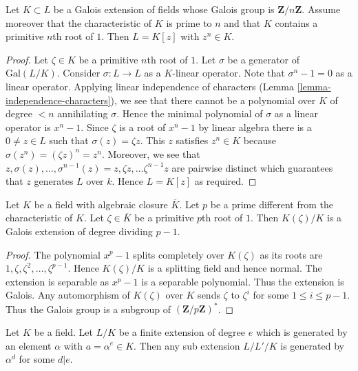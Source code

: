 \begin{lemma}
\label{lemma-Kummer}
Let $K \subset L$ be a Galois extension of fields whose Galois group is
$\mathbf{Z}/n\mathbf{Z}$. Assume moreover that the characteristic of $K$
is prime to $n$ and that $K$ contains a primitive $n$th root of $1$.
Then $L = K[z]$ with $z^n \in K$.
\end{lemma}

\begin{proof}
Let $\zeta \in K$ be a primitive $n$th root of $1$.
Let $\sigma$ be a generator of $\text{Gal}(L/K)$.
Consider $\sigma : L \to L$ as a $K$-linear operator.
Note that $\sigma^n - 1 = 0$ as a linear operator.
Applying linear independence of characters
(Lemma \ref{lemma-independence-characters}), we see
that there cannot be a polynomial over $K$ of degree $< n$
annihilating $\sigma$. Hence the minimal polynomial of $\sigma$
as a linear operator is $x^n - 1$. 
Since $\zeta$ is a root of $x^n - 1$ by linear algebra
there is a $0 \neq z \in L$ such that $\sigma(z) = \zeta z$.
This $z$ satisfies $z^n \in K$ because
$\sigma(z^n) = (\zeta z)^n = z^n$. Moreover, we see that
$z, \sigma(z), \ldots, \sigma^{n - 1}(z) =
z, \zeta z, \ldots \zeta^{n - 1} z$ are pairwise distinct
which guarantees that $z$ generates $L$ over $k$.
Hence $L = K[z]$ as required.
\end{proof}

\begin{lemma}
\label{lemma-adjoint-pth-root-unity}
Let $K$ be a field with algebraic closure $\overline{K}$.
Let $p$ be a prime different from the characteristic of $K$.
Let $\zeta \in \overline{K}$ be a primitive $p$th root
of $1$. Then $K(\zeta)/K$ is a Galois extension of degree dividing $p - 1$.
\end{lemma}

\begin{proof}
The polynomial $x^p - 1$ splits completely over
$K(\zeta)$ as its roots are $1, \zeta, \zeta^2, \ldots, \zeta^{p - 1}$.
Hence $K(\zeta)/K$ is a splitting field and hence normal.
The extension is separable as $x^p - 1$ is a separable polynomial.
Thus the extension is Galois. Any automorphism of $K(\zeta)$ over $K$
sends $\zeta$ to $\zeta^i$ for some $1 \leq i \leq p - 1$.
Thus the Galois group is a subgroup of $(\mathbf{Z}/p\mathbf{Z})^*$.
\end{proof}

\begin{lemma}
\label{lemma-subfields-kummer}
Let $K$ be a field. Let $L/K$ be a finite extension of degree $e$
which is generated by an element $\alpha$ with $a = \alpha^e \in K$.
Then any sub extension $L/L'/K$ is generated by $\alpha^d$ for some $d | e$.
\end{lemma}

